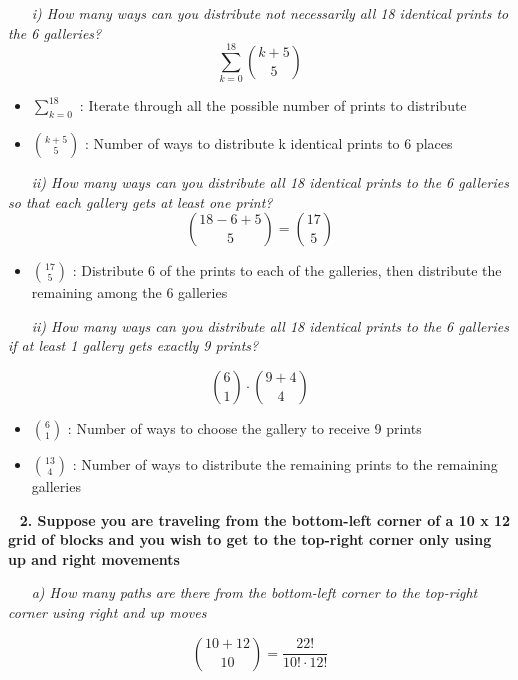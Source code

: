 \documentclass[12pt, letterpaper]{article}
\begin{document}
\-\ \newline
\-\ \it{ i) How many ways can you distribute not necessarily all 18 identical prints to the 6 galleries?  } 
\[ \sum_{k=0}^{18} {k+5 \choose 5}  \]

\begin{itemize}
    \item \(\sum_{k=0}^{18} \) : Iterate through all the possible number of prints to distribute
    \item \({k+5 \choose 5}\) : Number of ways to distribute k identical prints to 6 places
\end{itemize} 


\-\ \newline
\-\ \it{ ii) How many ways can you distribute all 18 identical prints to the 6 galleries so that each gallery
gets at least one print? } 
\[ {18 - 6 + 5 \choose 5} = {17 \choose 5}  \]

\begin{itemize}
    \item \({17 \choose 5} \) : Distribute 6 of the prints to each of the galleries, then distribute the remaining among the 6 galleries
\end{itemize} 


\-\ \newline
\-\ \it{ ii) How many ways can you distribute all 18 identical prints to the 6 galleries if at least 1 gallery
gets exactly 9 prints? }

\[ {6 \choose 1} \cdot {9 + 4 \choose 4} \]

\begin{itemize}
    \item \({6 \choose 1} \) : Number of ways to choose the gallery to receive 9 prints
    \item \({13 \choose 4} \) : Number of ways to distribute the remaining prints to the remaining galleries
\end{itemize} 



\newpage
\-\ \newline
\bf{ 2. Suppose you are traveling from the bottom-left corner of a 10 x 12 grid of blocks and you wish to get
to the top-right corner only using up and right movements }

\-\ \newline
\-\ \it{ a) How many paths are there from the bottom-left corner to the top-right corner using right and up
moves }

\[ {10 + 12 \choose 10} = \frac{22!}{10! \cdot 12!} \]
\end{document}
